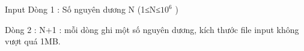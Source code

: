 Input
Dòng 1 : Số nguyên dương N (1≤N≤$10^{6}$   )  

   Dòng 2 : N+1 : mỗi dòng ghi một số nguyên dương, kích thước file input không vượt quá 1MB.